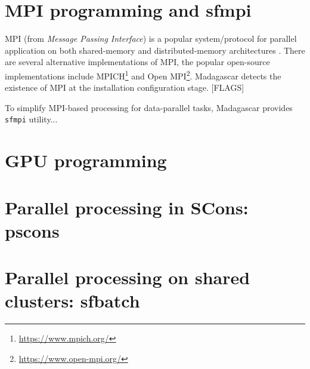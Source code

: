 \section{MPI programming and sfmpi}

MPI (from \emph{Message Passing Interface}) is a popular
system/protocol for parallel application on both shared-memory and
distributed-memory architectures \cite[]{pacheco,gropp}. There are several alternative
implementations of MPI, the popular open-source implementations
include MPICH\footnote{\url{https://www.mpich.org/}} and Open
MPI\footnote{\url{https://www.open-mpi.org/}}. Madagascar detects the
existence of MPI at the installation configuration stage. [FLAGS]

To simplify MPI-based processing for data-parallel tasks,
Madagascar provides \texttt{sfmpi} utility...

\section{GPU programming}

\section{Parallel processing in SCons: pscons}

\section{Parallel processing on shared clusters: sfbatch}




